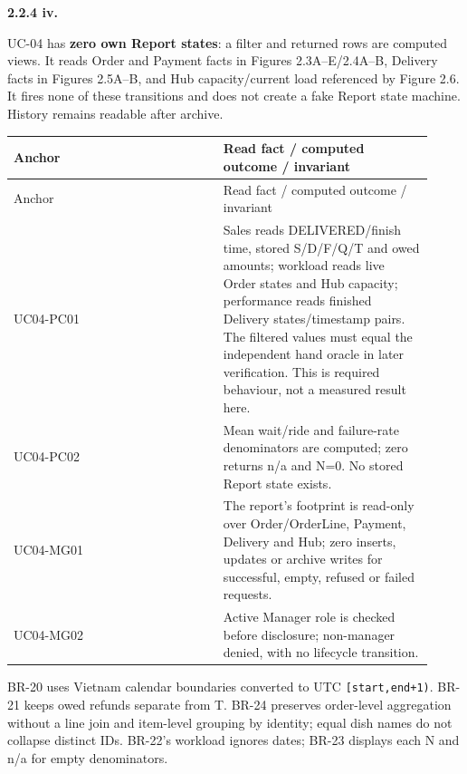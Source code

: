 \textbf{2.2.4 iv.}\par
UC-04 has \textbf{zero own Report states}: a filter and returned rows are computed views. It reads Order and Payment facts in Figures 2.3A--E/2.4A--B, Delivery facts in Figures 2.5A--B, and Hub capacity/current load referenced by Figure 2.6. It fires none of these transitions and does not create a fake Report state machine. History remains readable after archive.

\begin{longtable}{>{\raggedright\arraybackslash}p{0.4600\linewidth}>{\raggedright\arraybackslash}p{0.4600\linewidth}}
Anchor & Read fact / computed outcome / invariant \\
\hline\endfirsthead
Anchor & Read fact / computed outcome / invariant \\
\hline\endhead
UC04-PC01 & Sales reads DELIVERED/finish time, stored S/D/F/Q/T and owed amounts; workload reads live Order states and Hub capacity; performance reads finished Delivery states/timestamp pairs. The filtered values must equal the independent hand oracle in later verification. This is required behaviour, not a measured result here. \\
UC04-PC02 & Mean wait/ride and failure-rate denominators are computed; zero returns n/a and N=0. No stored Report state exists. \\
UC04-MG01 & The report's footprint is read-only over Order/OrderLine, Payment, Delivery and Hub; zero inserts, updates or archive writes for successful, empty, refused or failed requests. \\
UC04-MG02 & Active Manager role is checked before disclosure; non-manager denied, with no lifecycle transition. \\
\end{longtable}
BR-20 uses Vietnam calendar boundaries converted to UTC \texttt{[start,end+1)}. BR-21 keeps owed refunds separate from T. BR-24 preserves order-level aggregation without a line join and item-level grouping by identity; equal dish names do not collapse distinct IDs. BR-22's workload ignores dates; BR-23 displays each N and n/a for empty denominators.
